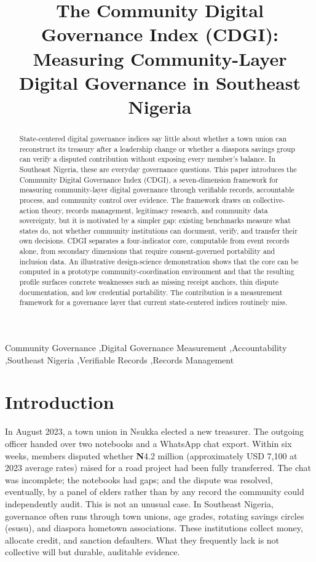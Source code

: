 \documentclass[review,onecolumn]{elsarticle}
\begin{document}
\begin{frontmatter}

\title{The Community Digital Governance Index (CDGI): Measuring Community-Layer Digital Governance in Southeast Nigeria}

\begin{abstract}
State-centered digital governance indices say little about whether a town union can reconstruct its treasury after a leadership change or whether a diaspora savings group can verify a disputed contribution without exposing every member's balance. In Southeast Nigeria, these are everyday governance questions. This paper introduces the Community Digital Governance Index (CDGI), a seven-dimension framework for measuring community-layer digital governance through verifiable records, accountable process, and community control over evidence. The framework draws on collective-action theory, records management, legitimacy research, and community data sovereignty, but it is motivated by a simpler gap: existing benchmarks measure what states do, not whether community institutions can document, verify, and transfer their own decisions. CDGI separates a four-indicator core, computable from event records alone, from secondary dimensions that require consent-governed portability and inclusion data. An illustrative design-science demonstration shows that the core can be computed in a prototype community-coordination environment and that the resulting profile surfaces concrete weaknesses such as missing receipt anchors, thin dispute documentation, and low credential portability. The contribution is a measurement framework for a governance layer that current state-centered indices routinely miss.
\end{abstract}

\begin{keyword}
Community Governance \sep Digital Governance Measurement \sep Accountability \sep Southeast Nigeria \sep Verifiable Records \sep Records Management
\end{keyword}

\end{frontmatter}

\section{Introduction}

In August 2023, a town union in Nsukka elected a new treasurer. The outgoing officer handed over two notebooks and a WhatsApp chat export. Within six weeks, members disputed whether \textbf{N}4.2 million (approximately USD 7,100 at 2023 average rates) raised for a road project had been fully transferred. The chat was incomplete; the notebooks had gaps; and the dispute was resolved, eventually, by a panel of elders rather than by any record the community could independently audit. This is not an unusual case. In Southeast Nigeria, governance often runs through town unions, age grades, rotating savings circles (esusu), and diaspora hometown associations. These institutions collect money, allocate credit, and sanction defaulters. What they frequently lack is not collective will but durable, auditable evidence.
\end{document}
